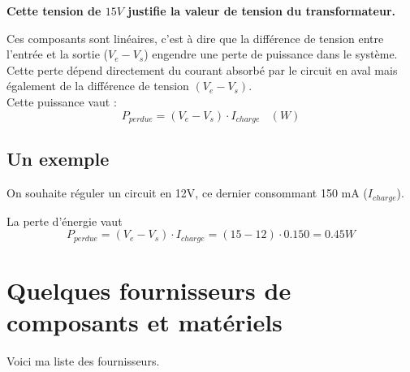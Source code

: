 \documentclass[12pt]{report}
\renewcommand{\bold}[1]{\textbf{#1}}
\begin{document}
  \bold{Cette tension de $15V$ justifie la valeur de tension du transformateur.}

  Ces composants sont linéaires, c'est à dire que la différence de tension entre l'entrée et la sortie ($V_{e}-V_s$) engendre une perte de puissance dans le système.\\
  Cette perte dépend directement du courant absorbé par le circuit en aval mais également de la différence de tension $(V_e-V_s)$.\\
  Cette puissance vaut : $$ P_{perdue} =(V_e-V_s)\cdot I_{charge} ~~~~(W)$$

  \subsection{Un exemple}

  On souhaite réguler un circuit en 12V, ce dernier consommant 150 mA ($I_{charge}$).

  La perte d'énergie vaut $$ P_{perdue} =(V_e-V_s)\cdot I_{charge} =(15-12)\cdot 0.150 = 0.45 W$$





  \appendix

  \section{Quelques fournisseurs de composants et matériels}

  Voici ma liste des fournisseurs.
\end{document}
